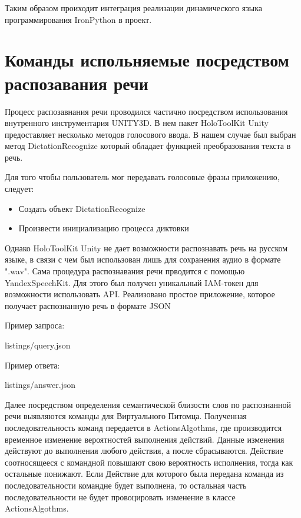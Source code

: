 Таким образом проиходит интеграция реализации динамического языка программирования IronPython в проект.

\section{Команды испольняемые посредством распозавания речи}

Процесс распозавнания речи проводился частично посредством использования 
внутренного инструментария UNITY3D. В нем пакет HoloToolKit Unity
предоставляет несколько методов голосового ввода. В нашем случае был 
выбран метод DictationRecognize который обладает функцией преобразования 
текста в речь. 

Для того чтобы пользователь мог передавать голосовые фразы приложению, следует:

\begin{itemize}
  \item Создать объект DictationRecognize
  \item Произвести инициализацию процесса диктовки
\end{itemize}

Однако HoloToolKit Unity не дает возможности распознавать речь на
русском языке, в связи с чем был использован лишь для сохранения 
аудио в формате ".wav". Сама процедура распознавания речи прводится
с помощью YandexSpeechKit. Для этого был получен уникальный 
IAM-токен для возможности использовать API. Реализовано простое приложение, 
которое получает распознанную речь в формате JSON 

Пример запроса: 


{listings/query.json}

Пример ответа: 


{listings/answer.json}

Далее посредством определения семантической близости слов по распознанной речи 
выявляются команды для Виртуального Питомца. Полученная последовательность 
команд передается в ActionsAlgothms, где производится временное изменение 
вероятностей выполнения действий. Данные изменения действуют до выполнения 
любого действия, а после сбрасываются. Действие соотносящееся с командной 
повышают свою вероятность исполнения, тогда как остальные понижают. Если 
Действие для которого была передана команда из последовательности командне будет 
выполнена, то остальная часть последовательности не будет провоцировать изменение
в классе ActionsAlgothms. 


